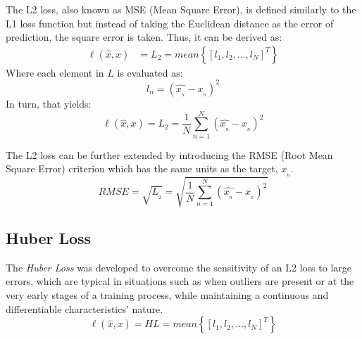 The L2 loss, also known as MSE (Mean Square Error), is defined similarly to
the L1 loss function but instead of taking the Euclidean distance as 
the error of prediction, the square error is taken. Thus, 
it can be derived as:
\begin{align}
    \ell(\hat{x}, x) & = L_{2} = mean\left\{ \left[ l_{1}, l_{2},...,l_{N}\right]^{T}\right\}
\end{align}
Where each element in \(L\) is evaluated as:
\begin{equation*}
    l_{n} = \left(\widehat{x_{_{n}}} - x_{_{n}}\right)^{2}
\end{equation*}
In turn, that yields:
\begin{equation}
    \ell(\hat{x}, x) = L_{2} = \frac{1}{N} \sum_{n=1}^{N} \left(\widehat{x_{_{n}}} - x_{_{n}}\right)^{2}
\end{equation}

The L2 loss can be further extended by introducing the 
RMSE (Root Mean Square Error) criterion which has the same units 
as the target, \(x_{_{n}}\).
\begin{equation}
    RMSE = \sqrt{L_{_{2}}} = \sqrt{\frac{1}{N} \sum_{n=1}^{N} \left(\widehat{x_{_{n}}} - x_{_{n}}\right)^{2}}
\end{equation}

\subsection{Huber Loss}
The \emph{Huber Loss} was developed to overcome 
the sensitivity of an L2 loss to large errors, which are typical in situations
such as when outliers are present or at the very early stages of a training process,
while maintaining a continuous and differentiable characteristics' nature.
\begin{equation}
    \ell(\hat{x}, x) = HL = mean\left\{ \left[ l_{1}, l_{2},...,l_{N}\right]^{T}\right\}
\end{equation}


